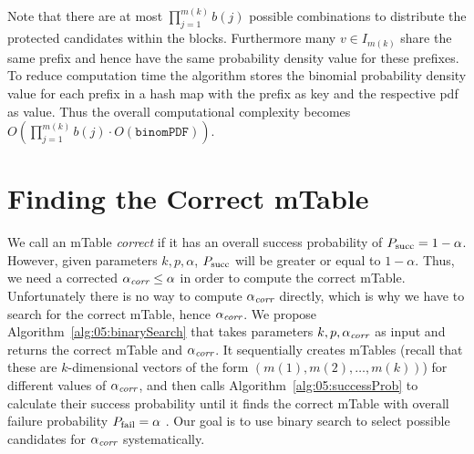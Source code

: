 Note that there are at most $\prod_{j=1}^{m(k)}b(j)$ possible combinations to distribute the protected candidates within the blocks.
%
Furthermore many $v \in I_{m(k)}$ share the same prefix and hence have the same probability density value for these prefixes.
%
To reduce computation time the algorithm stores the binomial probability density value for each prefix in a hash map with the prefix as key and the respective pdf as value.
%
Thus the overall computational complexity becomes $O(\prod_{j=1}^{m(k)}b(j) \cdot O(\texttt{binomPDF}))$.

\section{Finding the Correct mTable}\label{subsec:finding-mtable}
We call an mTable \textit{correct} if it has an overall success probability of $P_{\operatorname{succ}} = 1-\alpha$.
However, given parameters $k,p,\alpha$, $P_{\operatorname{succ}}$ will be greater or equal to $1-\alpha$. Thus, we need a corrected $\alpha_\textit{corr} \leq \alpha$ in order to compute the correct mTable. Unfortunately there is no way to compute $\alpha_\textit{corr}$ directly, which is why we have to search for the correct mTable, hence $\alpha_\textit{corr}$.
We propose Algorithm~\ref{alg:05:binarySearch} that takes  parameters $k, p, \alpha_\textit{corr}$ as input and returns the correct mTable and $\alpha_\textit{corr}$.
%
%
It sequentially creates mTables (recall that these are $k$-dimensional vectors of the form $(m(1), m(2), \ldots , m(k))$) for different values of $\alpha_\textit{corr}$, and then calls Algorithm~\ref{alg:05:successProb} to calculate their success probability until it finds the correct mTable with overall failure probability $P_{\operatorname{fail}} = \alpha$ .
%
Our goal is to use binary search to select possible candidates for $\alpha_\textit{corr}$ systematically.

